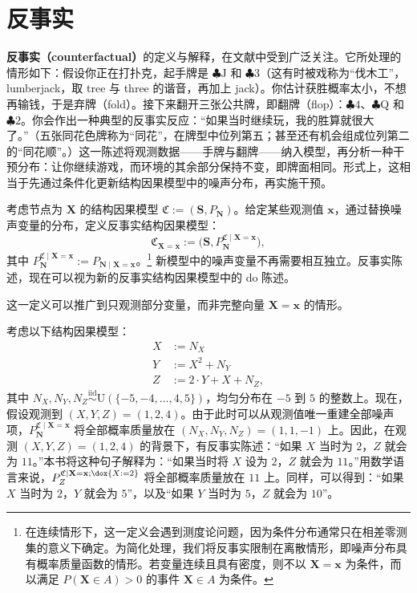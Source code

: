 \section{反事实}
\label{sec:ch06-counterfactuals}

\textbf{反事实（counterfactual）}的定义与解释，在文献中受到广泛关注。它所处理的情形如下：假设你正在打扑克，起手牌是 $\clubsuit\mathrm J$ 和 $\clubsuit3$（这有时被戏称为“伐木工”，lumberjack，取 tree 与 three 的谐音，再加上 jack）。你估计获胜概率太小，不想再输钱，于是弃牌（fold）。接下来翻开三张公共牌，即翻牌（flop）：$\clubsuit4$、$\clubsuit\mathrm Q$ 和 $\clubsuit2$。你会作出一种典型的反事实反应：“如果当时继续玩，我的胜算就很大了。”（五张同花色牌称为“同花”，在牌型中位列第五；甚至还有机会组成位列第二的“同花顺”。）这一陈述将观测数据——手牌与翻牌——纳入模型，再分析一种干预分布：让你继续游戏，而环境的其余部分保持不变，即牌面相同。形式上，这相当于先通过条件化更新结构因果模型中的噪声分布，再实施干预。

\begin{definition}[反事实]
考虑节点为 $\mathbf X$ 的结构因果模型 $\mathfrak C:=(\mathbf S,P_{\mathbf N})$。给定某些观测值 $\mathbf x$，通过替换噪声变量的分布，定义反事实结构因果模型：
\[
 \mathfrak C_{\mathbf X=\mathbf x}
 :=\bigl(\mathbf S,P_{\mathbf N}^{\mathfrak C\mid\mathbf X=\mathbf x}\bigr),
\]
其中 $P_{\mathbf N}^{\mathfrak C\mid\mathbf X=\mathbf x}:=P_{\mathbf N\mid\mathbf X=\mathbf x}$。\footnote{在连续情形下，这一定义会遇到测度论问题，因为条件分布通常只在相差零测集的意义下确定。为简化处理，我们将反事实限制在离散情形，即噪声分布具有概率质量函数的情形。若变量连续且具有密度，则不以 $\mathbf X=\mathbf x$ 为条件，而以满足 $P(\mathbf X\in A)>0$ 的事件 $\mathbf X\in A$ 为条件。}
新模型中的噪声变量不再需要相互独立。反事实陈述，现在可以视为新的反事实结构因果模型中的 do 陈述。
\end{definition}

这一定义可以推广到只观测部分变量，而非完整向量 $\mathbf X=\mathbf x$ 的情形。

\begin{example}[计算反事实]
考虑以下结构因果模型：
\[
 \begin{aligned}
 X&:=N_X\\
 Y&:=X^2+N_Y\\
 Z&:=2\cdot Y+X+N_Z,
 \end{aligned}
\]
其中 $N_X,N_Y,N_Z\overset{\mathrm{iid}}{\sim}\mathrm U(\{-5,-4,\ldots,4,5\})$，均匀分布在 $-5$ 到 $5$ 的整数上。现在，假设观测到 $(X,Y,Z)=(1,2,4)$。由于此时可以从观测值唯一重建全部噪声项，$P_{\mathbf N}^{\mathfrak C\mid\mathbf X=\mathbf x}$ 将全部概率质量放在 $(N_X,N_Y,N_Z)=(1,1,-1)$ 上。因此，在观测 $(X,Y,Z)=(1,2,4)$ 的背景下，有反事实陈述：“如果 $X$ 当时为 $2$，$Z$ 就会为 $11$。”本书将这种句子解释为：“如果当时将 $X$ 设为 $2$，$Z$ 就会为 $11$。”用数学语言来说，$P_Z^{\mathfrak C\mid\mathbf X=\mathbf x;\dox{X:=2}}$ 将全部概率质量放在 $11$ 上。同样，可以得到：“如果 $X$ 当时为 $2$，$Y$ 就会为 $5$”，以及“如果 $Y$ 当时为 $5$，$Z$ 就会为 $10$”。
\end{example}

